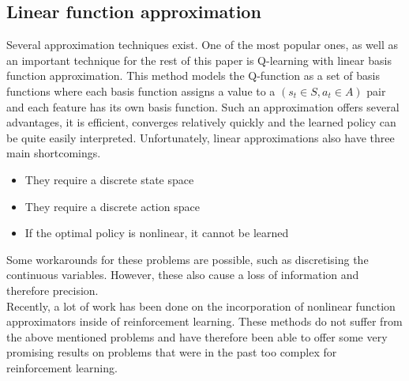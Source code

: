 \subsection{Linear function approximation}
Several approximation techniques exist. One of the most popular ones, as well as an important technique for the rest of this paper is Q-learning with linear basis function approximation. This method models the Q-function as a set of basis functions where each basis function assigns a value to a $(s_t \in S,a_t \in A)$ pair and each feature has its own basis function. Such an approximation offers several advantages, it is efficient, converges relatively quickly and the learned policy can be quite easily interpreted. Unfortunately, linear approximations also have three main shortcomings.
\begin{itemize}
	\item They require a discrete state space
	\item They require a discrete action space
	\item If the optimal policy is nonlinear, it cannot be learned
\end{itemize}
Some workarounds for these problems are possible, such as discretising the continuous variables. However, these also cause a loss of information and therefore precision.\\
Recently, a lot of work has been done on the incorporation of nonlinear function approximators inside of reinforcement learning. These methods do not suffer from the above mentioned problems and have therefore been able to offer some very promising results on problems that were in the past too complex for reinforcement learning.
